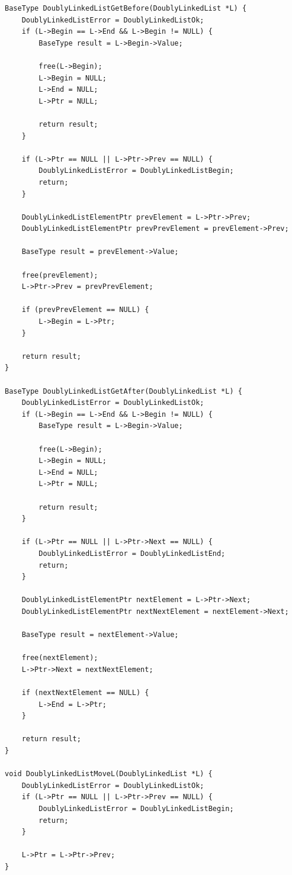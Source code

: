 \documentclass[a4paper,14pt]{extarticle}
\begin{document}
\begin{enumerate}
\begin{verbatim}
BaseType DoublyLinkedListGetBefore(DoublyLinkedList *L) {
    DoublyLinkedListError = DoublyLinkedListOk;
    if (L->Begin == L->End && L->Begin != NULL) {
        BaseType result = L->Begin->Value;

        free(L->Begin);
        L->Begin = NULL;
        L->End = NULL;
        L->Ptr = NULL;

        return result;
    }

    if (L->Ptr == NULL || L->Ptr->Prev == NULL) {
        DoublyLinkedListError = DoublyLinkedListBegin;
        return;
    }

    DoublyLinkedListElementPtr prevElement = L->Ptr->Prev;
    DoublyLinkedListElementPtr prevPrevElement = prevElement->Prev;

    BaseType result = prevElement->Value;

    free(prevElement);
    L->Ptr->Prev = prevPrevElement;

    if (prevPrevElement == NULL) {
        L->Begin = L->Ptr;
    }

    return result;
}

BaseType DoublyLinkedListGetAfter(DoublyLinkedList *L) {
    DoublyLinkedListError = DoublyLinkedListOk;
    if (L->Begin == L->End && L->Begin != NULL) {
        BaseType result = L->Begin->Value;

        free(L->Begin);
        L->Begin = NULL;
        L->End = NULL;
        L->Ptr = NULL;

        return result;
    }

    if (L->Ptr == NULL || L->Ptr->Next == NULL) {
        DoublyLinkedListError = DoublyLinkedListEnd;
        return;
    }

    DoublyLinkedListElementPtr nextElement = L->Ptr->Next;
    DoublyLinkedListElementPtr nextNextElement = nextElement->Next;

    BaseType result = nextElement->Value;

    free(nextElement);
    L->Ptr->Next = nextNextElement;

    if (nextNextElement == NULL) {
        L->End = L->Ptr;
    }

    return result;
}

void DoublyLinkedListMoveL(DoublyLinkedList *L) {
    DoublyLinkedListError = DoublyLinkedListOk;
    if (L->Ptr == NULL || L->Ptr->Prev == NULL) {
        DoublyLinkedListError = DoublyLinkedListBegin;
        return;
    }

    L->Ptr = L->Ptr->Prev;
}


\end{verbatim}
\end{enumerate}
\end{document}
